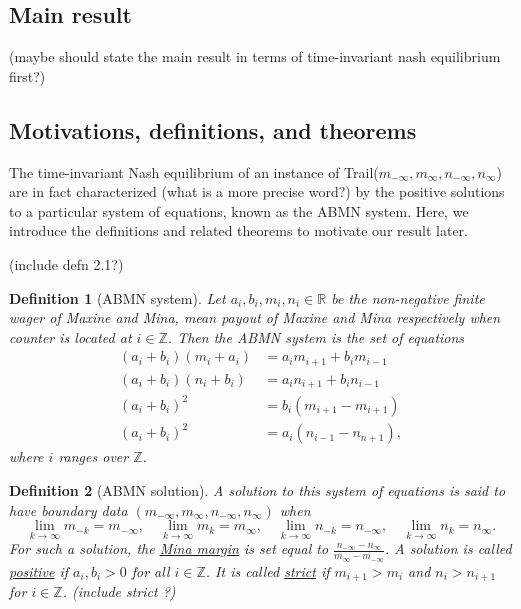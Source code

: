 \documentclass{article}
\newtheorem{definition}{Definition}
\newcommand*{\R}{\mathbb{R}}
\begin{document}
\subsection{\centering Main result}
(maybe should state the main result in terms of time-invariant nash equilibrium first?)

\subsection{\centering Motivations, definitions, and theorems}
The time-invariant Nash equilibrium of an instance of Trail($m_{-\infty},
m_{\infty}, n_{-\infty}, n_{\infty}$) are in fact characterized (what is a
more precise word?) by the positive solutions to a particular system of equations, known as the ABMN system. Here, we
introduce the definitions and related theorems to motivate our result later.

(include defn 2.1?)

\begin{definition}[ABMN system]
    Let $a_i, b_i, m_i, n_i \in\R$ be the non-negative finite wager of Maxine and Mina, mean payout
    of Maxine and Mina respectively when counter is located at $i\in\mathbb{Z}$. Then the ABMN
    system is the set of equations 
    \begin{align}
        (a_i + b_i)(m_i + a_i) & = a_i m_{i+1} + b_i m_{i-1} \\
        (a_i + b_i)(n_i + b_i) & = a_i n_{i+1} + b_i n_{i-1} \\
        (a_i + b_i)^2 & = b_i (m_{i+1} - m_{i+1}) \\
        (a_i + b_i)^2 & = a_i (n_{i-1} - n_{n+1}),
    \end{align}
    where $i$ ranges over $\mathbb{Z}$. 
\end{definition}

\begin{definition}[ABMN solution]
    A solution to this system of equations is said to have boundary data $(m_{-\infty}, m_{\infty},
    n_{-\infty}, n_{\infty})$ when 
    $$\lim_{k\to\infty}m_{-k}=m_{-\infty}, \quad \lim_{k\to\infty}m_{k}=m_{\infty}, \quad
    \lim_{k\to\infty}n_{-k}=n_{-\infty}, \quad \lim_{k\to\infty}n_{k}=n_{\infty}.$$ For such a
    solution, the \underline{Mina margin} is set equal to
    $\frac{n_{-\infty}-n_{\infty}}{m_{\infty}-m_{-\infty}}$. A solution is called
    \underline{positive} if $a_i, b_i >0$ for all $i\in\mathbb{Z}$. It is called \underline{strict}
    if $m_{i+1}>m_i$ and $n_i>n_{i+1}$ for $i\in\mathbb{Z}$. (include strict ?)
\end{definition}
\end{document}
